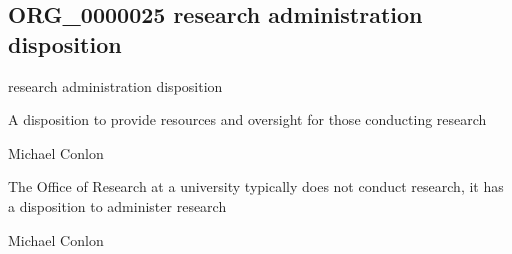 \documentclass[letterpaper,10pt,english]{sphinxmanual}
\begin{document}
\subsection{ORG\_0000025 \sphinxhyphen{} research administration disposition}
\label{\detokenize{doc-ORG_0000025:org-0000025-research-administration-disposition}}\label{\detokenize{doc-ORG_0000025:index-0}}\label{\detokenize{doc-ORG_0000025::doc}}
\begin{sphinxShadowBox}

\sphinxAtStartPar
research administration disposition
\end{sphinxShadowBox}

\begin{sphinxShadowBox}

\sphinxAtStartPar
{\hyperref[\detokenize{doc-BFO_0000016::doc}]{}}
\end{sphinxShadowBox}

\begin{sphinxShadowBox}

\sphinxAtStartPar
A disposition to provide resources and oversight for those conducting research
\end{sphinxShadowBox}

\begin{sphinxShadowBox}

\sphinxAtStartPar
Michael Conlon 
\end{sphinxShadowBox}

\begin{sphinxShadowBox}

\sphinxAtStartPar
The Office of Research at a university typically does not conduct research, it has a disposition to administer research
\end{sphinxShadowBox}

\begin{sphinxShadowBox}

\sphinxAtStartPar
Michael Conlon 
\end{sphinxShadowBox}
\begin{quote}

\ignorespaces \end{quote}
\end{document}
